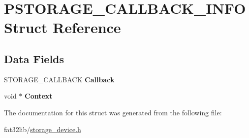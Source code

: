 \hypertarget{struct_s_t_o_r_a_g_e___c_a_l_l_b_a_c_k___i_n_f_o}{\section{P\-S\-T\-O\-R\-A\-G\-E\-\_\-\-C\-A\-L\-L\-B\-A\-C\-K\-\_\-\-I\-N\-F\-O Struct Reference}
\label{struct_s_t_o_r_a_g_e___c_a_l_l_b_a_c_k___i_n_f_o}
}
\subsection*{Data Fields}
\begin{DoxyCompactItemize}
\item 
\hypertarget{struct_s_t_o_r_a_g_e___c_a_l_l_b_a_c_k___i_n_f_o_a97fddaa8cdca96ac63afdd56f05d0787}{S\-T\-O\-R\-A\-G\-E\-\_\-\-C\-A\-L\-L\-B\-A\-C\-K {\bfseries Callback}}\label{struct_s_t_o_r_a_g_e___c_a_l_l_b_a_c_k___i_n_f_o_a97fddaa8cdca96ac63afdd56f05d0787}

\item 
\hypertarget{struct_s_t_o_r_a_g_e___c_a_l_l_b_a_c_k___i_n_f_o_ad9e8f0bfab04a84bf3f5c7bcb1612122}{void $\ast$ {\bfseries Context}}\label{struct_s_t_o_r_a_g_e___c_a_l_l_b_a_c_k___i_n_f_o_ad9e8f0bfab04a84bf3f5c7bcb1612122}

\end{DoxyCompactItemize}


The documentation for this struct was generated from the following file\-:\begin{DoxyCompactItemize}
\item 
fat32lib/\hyperlink{storage__device_8h}{storage\-\_\-device.\-h}\end{DoxyCompactItemize}
